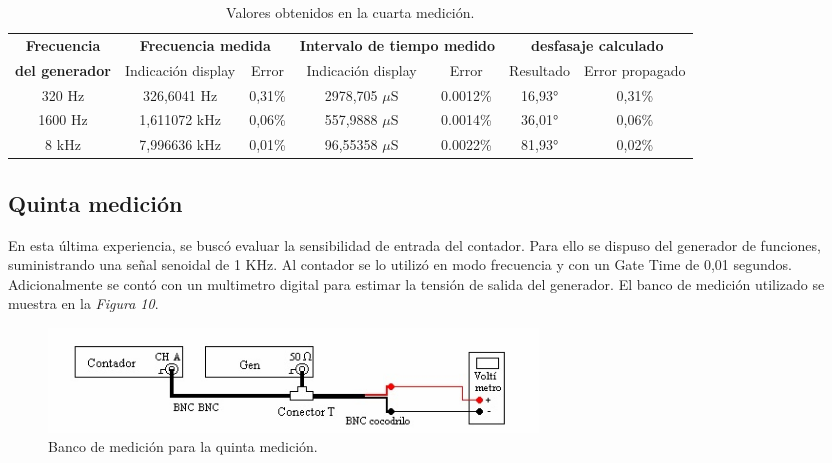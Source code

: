 \documentclass{article}
\begin{document}
\begin{table}[!hbt]
	\begin{center}

		\begin{tabular}{|c|c|c|c|c|c|c|} \hline
			\textbf{Frecuencia} & \multicolumn{2}{c|}{\textbf{Frecuencia medida}} & \multicolumn{2}{c|}{\textbf{Intervalo de tiempo medido}} & \multicolumn{2}{c|}{\textbf{desfasaje calculado}} \\\cline{2-7}
			\textbf{del generador} & Indicación display & Error & Indicación display & Error & Resultado & Error propagado \\\hline
			
			320 Hz & 326,6041 Hz & 0,31\% & 2978,705 $\mu$S & 0.0012\% & 16,93° & 0,31\% \\\hline
			1600 Hz & 1,611072 kHz & 0,06\% & 557,9888 $\mu$S & 0.0014\% & 36,01° & 0,06\% \\\hline
			8 kHz & 7,996636 kHz & 0,01\% & 96,55358 $\mu$S & 0.0022\% & 81,93° & 0,02\% \\\hline

		\end{tabular}

	\caption{Valores obtenidos en la cuarta medición.}
	\end{center}
\end{table}
\bigskip



\subsection{Quinta medición}
\medskip

	En esta última experiencia, se buscó evaluar la sensibilidad de entrada del contador. Para ello se dispuso del generador de funciones, suministrando una señal senoidal de 1 KHz. Al contador se lo utilizó en modo frecuencia y con un Gate Time de 0,01 segundos. Adicionalmente se contó con un multimetro digital para estimar la tensión de salida del generador. El banco de medición utilizado se muestra en la \textit{Figura 10}.
\bigskip


\begin{figure}[h]
	\centering
	\includegraphics[width=0.63\textwidth]{images/10-bancoMedicionMed5.jpg}
	\medskip
	\caption{Banco de medición para la quinta medición.}
\end{figure}
\bigskip\bigskip
\end{document}
